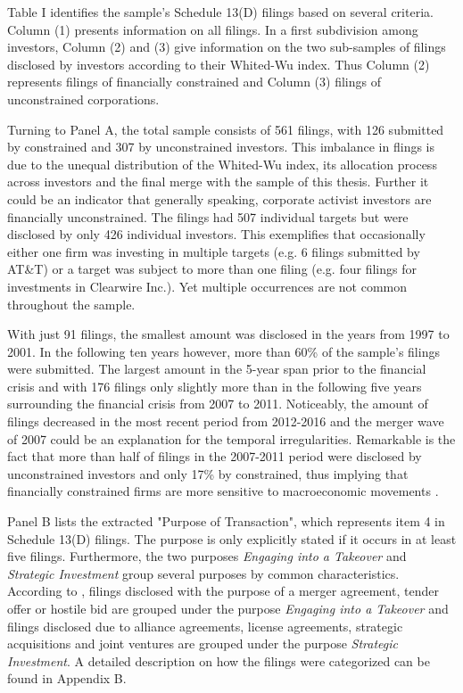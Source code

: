 \documentclass[12pt]{article}
\begin{document}
\noindent Table I identifies the sample's Schedule 13(D) filings based on several criteria. Column (1) presents information on all filings. In a first subdivision among investors, Column (2) and (3) give information on the two sub-samples of filings disclosed by investors according to their Whited-Wu index. Thus Column (2) represents filings of financially constrained and Column (3) filings of unconstrained corporations.\par
Turning to Panel A, the total sample consists of 561 filings, with 126 submitted by constrained and 307 by unconstrained investors. This imbalance in flings is due to the unequal distribution of the Whited-Wu index, its allocation process across investors and the final merge with the sample of this thesis. Further it could be an indicator that generally speaking, corporate activist investors are financially unconstrained. The filings had 507 individual targets but were disclosed by only 426 individual investors. This exemplifies that occasionally either one firm was investing in multiple targets (e.g. 6 filings submitted by AT\&T) or a target was subject to more than one filing (e.g. four filings for investments in Clearwire Inc.). Yet multiple occurrences are not common throughout the sample.\par
With just 91 filings, the smallest amount was disclosed in the years from 1997 to 2001. In the following ten years however, more than 60\% of the sample's filings were submitted. The largest amount in the 5-year span prior to the financial crisis and with 176 filings only slightly more than in the following five years surrounding the financial crisis from 2007 to 2011. Noticeably, the amount of filings decreased in the most recent period from 2012-2016 and the merger wave of 2007 \citep[p.19]{Huang2017} could be an explanation for the temporal irregularities. Remarkable is the fact that more than half of filings in the 2007-2011 period were disclosed by unconstrained investors and only 17\% by constrained, thus implying that financially constrained firms are more sensitive to macroeconomic movements \citep[p.1197]{Campello2006}.\par
Panel B lists the extracted "Purpose of Transaction", which represents item 4 in Schedule 13(D) filings. The purpose is only explicitly stated if it occurs in at least five filings. Furthermore, the two purposes \emph{Engaging into a Takeover} and \emph{Strategic Investment} group several purposes by common characteristics. According to \citet[p.1]{Betton2008}, filings disclosed with the purpose of a merger agreement, tender offer or hostile bid are grouped under the purpose \emph{Engaging into a Takeover} and filings disclosed due to alliance agreements, license agreements, strategic acquisitions and joint ventures are grouped under the purpose \emph{Strategic Investment}. A detailed description on how the filings were categorized can be found in Appendix B.\par
\end{document}

